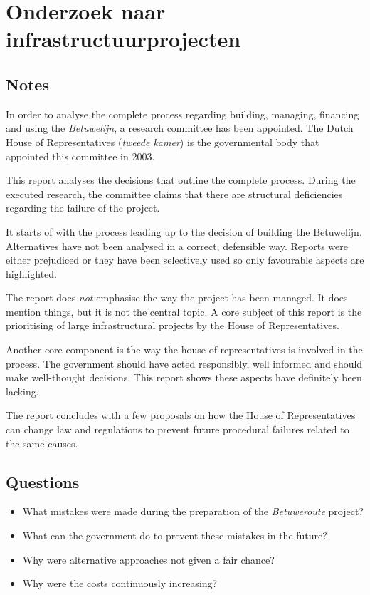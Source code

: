 \chapter{Onderzoek naar infrastructuurprojecten \cite{commissie-duivesteijn}}
\section{Notes}

In order to analyse the complete process regarding building, managing, financing and using the \emph{Betuwelijn}, a research committee has been appointed. 
The Dutch House of Representatives (\emph{tweede kamer}) is the governmental body that appointed this committee in 2003. 

This report analyses the decisions that outline the complete process. 
During the executed research, the committee claims that there are structural deficiencies regarding the failure of the project.

It starts of with the process leading up to the decision of building the Betuwelijn. 
Alternatives have not been analysed in a correct, defensible way. 
Reports were either prejudiced or they have been selectively used so only favourable aspects are highlighted.

The report does \emph{not} emphasise the way the project has been managed. 
It does mention things, but it is not the central topic.
A core subject of this report is the prioritising of large infrastructural projects by the House of Representatives. 

Another core component is the way the house of representatives is involved in the process. 
The government should have acted responsibly, well informed and should make well-thought decisions. 
This report shows these aspects have definitely been lacking. 

The report concludes with a few proposals on how the House of Representatives can change law and regulations to prevent future procedural failures related to the same causes. 

\section{Questions}
\begin{itemize}
  \item What mistakes were made during the preparation of the \emph{Betuweroute} project?
  \item What can the government do to prevent these mistakes in the future?
  \item Why were alternative approaches not given a fair chance?
  \item Why were the costs continuously increasing?
\end{itemize}

